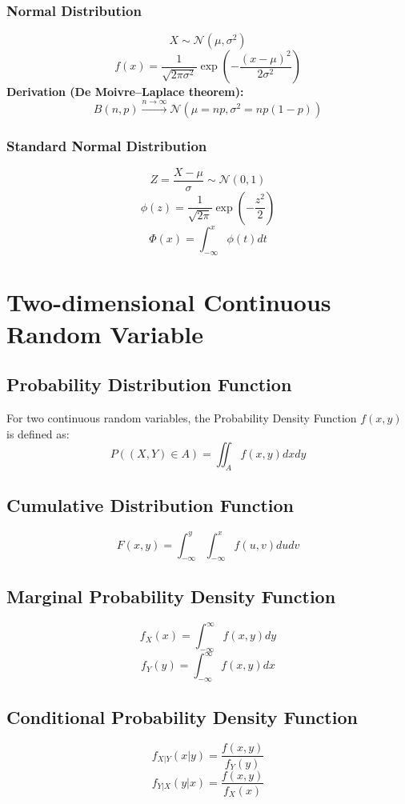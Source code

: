 \documentclass{article}
\begin{document}
\subsubsection{Normal Distribution}
\[ X \sim \mathcal{N}(\mu, \sigma^2) \]
\[
    f(x) = \frac{1}{\sqrt{2\pi\sigma^2}} \exp\left( -\frac{(x-\mu)^2}{2\sigma^2} \right)
\]
\textbf{Derivation (De Moivre–Laplace theorem):}
\[
    B(n, p) \xrightarrow{n \to \infty} \mathcal{N}(\mu = np, \sigma^2 = np(1-p))
\]

\subsubsection{Standard Normal Distribution}
\[ Z = \frac{X-\mu}{\sigma} \sim \mathcal{N}(0,1) \]
\[
    \phi(z) = \frac{1}{\sqrt{2\pi}} \exp\left( -\frac{z^2}{2} \right)
\]
\[
    \Phi(x) = \int_{-\infty}^{x} \phi(t)dt
\]

\newpage
\section{Two-dimensional Continuous Random Variable}

\subsection{Probability Distribution Function}
For two continuous random variables, the Probability Density Function \( f(x,y) \) is defined as:
\[
    P((X,Y) \in A) = \iint_{A} f(x,y) dx dy
\]

\subsection{Cumulative Distribution Function}
\[
    F(x,y) = \int_{-\infty}^{y} \int_{-\infty}^{x} f(u,v) du dv
\]

\subsection{Marginal Probability Density Function}
\[
    f_X(x) = \int_{-\infty}^{\infty} f(x,y)dy
\]
\[
    f_Y(y) = \int_{-\infty}^{\infty} f(x,y)dx
\]

\subsection{Conditional Probability Density Function}
\[
    f_{X|Y}(x|y) = \frac{f(x,y)}{f_Y(y)}
\]
\[
    f_{Y|X}(y|x) = \frac{f(x,y)}{f_X(x)}
\]
\end{document}
